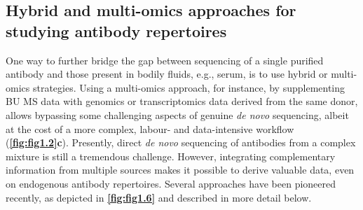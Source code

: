 \subsection{Hybrid and multi-omics approaches for studying antibody repertoires}
One way to further bridge the gap between sequencing of a single purified antibody and those present in bodily fluids, e.g., serum, is to use hybrid or multi-omics strategies. Using a multi-omics approach, for instance, by supplementing BU MS data with genomics or transcriptomics data derived from the same donor, allows bypassing some challenging aspects of genuine \emph{de novo} sequencing, albeit at the cost of a more complex, labour- and data-intensive workflow (\textbf{\autoref{fig:fig1.2}c}). Presently, direct \emph{de novo} sequencing of antibodies from a complex mixture is still a tremendous challenge. However, integrating complementary information from multiple sources makes it possible to derive valuable data, even on endogenous antibody repertoires. Several approaches have been pioneered recently, as depicted in \textbf{\autoref{fig:fig1.6}} and described in more detail below.

